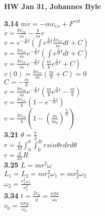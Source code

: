 \documentclass[english]{article}
\begin{document}
\textbf{HW Jan 31, Johannes Byle}\\
\begin{multicols*}{2}
\begin{flushleft}
\noindent
\textbf{3.14} $m\dot{v}=-\dot{m}v_{ex}+F^{ext}$\\
$\dot{v}=\frac{kv_{ex}}{m}-\frac{b}{m}v$\\
$v=e^{-\frac{b}{m}t}(\int e^{\frac{b}{m}t}\frac{kv_{ex}}{m}dt+C)$\\
$v=\frac{kv_{ex}}{m}e^{-\frac{b}{m}t}(\int e^{\frac{b}{m}t}dt+C)$\\
$v=\frac{kv_{ex}}{m}e^{-\frac{b}{m}t}(\frac{m}{b}e^{\frac{b}{m}t}+C)$\\
$v(0)=\frac{kv_{ex}}{m}(\frac{m}{b}+C)=0$\\
$C=-\frac{m}{b}$\\
$v=\frac{kv_{ex}}{m}e^{-\frac{b}{m}t}(\frac{m}{b}e^{\frac{b}{m}t}-\frac{m}{b})$\\
$v=\frac{kv_{ex}}{b}(1-e^{-\frac{b}{m}t})$\\
$v=\frac{kv_{ex}}{b}(1-(\frac{m}{m_0})^{\frac{b}{m}})$\\

\noindent
\textbf{3.21} $\theta = \frac{\pi}{2}$\\
$r=\frac{1}{M}\int_0^\theta\int_0^R rsin\theta rdrd\theta$\\
$r=\frac{4}{3\pi}R$\\

\noindent
\textbf{3.25} $L=mr^2\omega$\\
$L_1=L_2=mr_1^2\omega_1=mr_2^2\omega_2$\\
$\omega_2=\frac{r_1^2\omega_1}{r_2^2}$\\

\noindent
\textbf{3.34} $t=\frac{2v_0}{g}=\frac{n2\pi}{\omega_0}$\\
$v_0=\frac{n\pi g}{\omega_0}$\\

\end{flushleft}
\end{multicols*}
\end{document}
